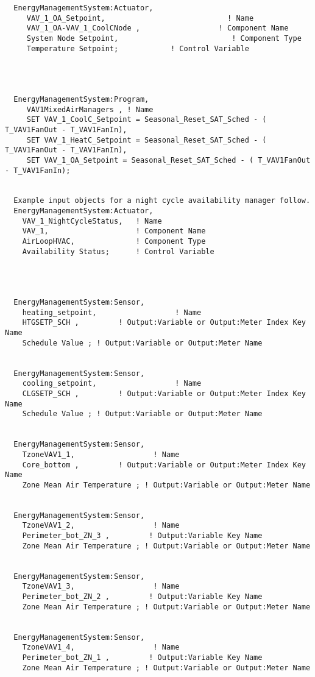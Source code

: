 \begin{lstlisting}
  EnergyManagementSystem:Actuator,
     VAV_1_OA_Setpoint,                            ! Name
     VAV_1_OA-VAV_1_CoolCNode ,                  ! Component Name
     System Node Setpoint,                          ! Component Type
     Temperature Setpoint;            ! Control Variable




  EnergyManagementSystem:Program,
     VAV1MixedAirManagers , ! Name
     SET VAV_1_CoolC_Setpoint = Seasonal_Reset_SAT_Sched - ( T_VAV1FanOut - T_VAV1FanIn),
     SET VAV_1_HeatC_Setpoint = Seasonal_Reset_SAT_Sched - ( T_VAV1FanOut - T_VAV1FanIn),
     SET VAV_1_OA_Setpoint = Seasonal_Reset_SAT_Sched - ( T_VAV1FanOut - T_VAV1FanIn);


  Example input objects for a night cycle availability manager follow.
  EnergyManagementSystem:Actuator,
    VAV_1_NightCycleStatus,   ! Name
    VAV_1,                    ! Component Name
    AirLoopHVAC,              ! Component Type
    Availability Status;      ! Control Variable




  EnergyManagementSystem:Sensor,
    heating_setpoint,                  ! Name
    HTGSETP_SCH ,         ! Output:Variable or Output:Meter Index Key Name
    Schedule Value ; ! Output:Variable or Output:Meter Name


  EnergyManagementSystem:Sensor,
    cooling_setpoint,                  ! Name
    CLGSETP_SCH ,         ! Output:Variable or Output:Meter Index Key Name
    Schedule Value ; ! Output:Variable or Output:Meter Name


  EnergyManagementSystem:Sensor,
    TzoneVAV1_1,                  ! Name
    Core_bottom ,         ! Output:Variable or Output:Meter Index Key Name
    Zone Mean Air Temperature ; ! Output:Variable or Output:Meter Name


  EnergyManagementSystem:Sensor,
    TzoneVAV1_2,                  ! Name
    Perimeter_bot_ZN_3 ,         ! Output:Variable Key Name
    Zone Mean Air Temperature ; ! Output:Variable or Output:Meter Name


  EnergyManagementSystem:Sensor,
    TzoneVAV1_3,                  ! Name
    Perimeter_bot_ZN_2 ,         ! Output:Variable Key Name
    Zone Mean Air Temperature ; ! Output:Variable or Output:Meter Name


  EnergyManagementSystem:Sensor,
    TzoneVAV1_4,                  ! Name
    Perimeter_bot_ZN_1 ,         ! Output:Variable Key Name
    Zone Mean Air Temperature ; ! Output:Variable or Output:Meter Name



\end{lstlisting}
